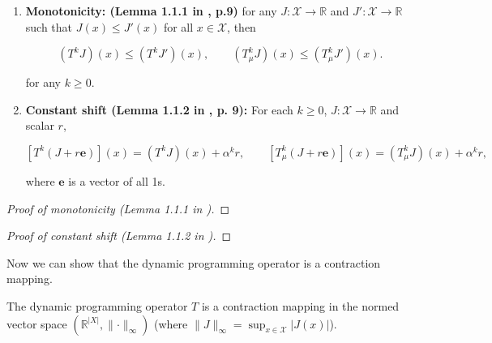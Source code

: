\begin{theorem}\label{dp.thm.dp.op.mono.cs}

\begin{enumerate}

\item

\textbf{Monotonicity: (Lemma 1.1.1 in \citet{v2_bertsekas2012dynamic}, p.9)} for any \(J: \mathcal{X} \to \mathbb{R}\) and \(J': \mathcal{X} \to \mathbb{R}\) such that \(J(x) \leq J'(x)\) for all \(x \in \mathcal{X}\), then

\[
(T^kJ)(x) \leq (T^k J')(x), \qquad (T_\mu^k J)(x) \leq (T_\mu^k J')(x).
\]

for any \(k \geq 0 \).

\item \textbf{Constant shift  (Lemma 1.1.2 in \citet{v2_bertsekas2012dynamic}, p. 9):} For each \(k \geq 0\),  \(J: \mathcal{X} \to \mathbb{R}\) and scalar \(r\),

\[
[T^k (J + r \boldsymbol{e})](x) = (T^kJ)(x) + \alpha^k r, \qquad  [T_\mu^k (J + r \boldsymbol{e})](x) = (T_\mu^kJ)(x) + \alpha^k r, 
\]

where \(\boldsymbol{e}\) is a vector of all 1s.


\end{enumerate}

\end{theorem}

\begin{proof}[Proof of monotonicity (Lemma 1.1.1 in \citet{v2_bertsekas2012dynamic})]

\end{proof}

\begin{proof}[Proof of constant shift (Lemma 1.1.2 in \citet{v2_bertsekas2012dynamic})]

\end{proof}



Now we can show that the dynamic programming operator is a contraction mapping.

\begin{theorem} \label{dp.op.c.mapping}

 The dynamic programming operator \(T\) is a contraction mapping in the normed vector space \((\mathbb{R}^{|X|}, \lVert \cdot \rVert_\infty)\) (where \( \lVert J \rVert_\infty = \sup_{x \in \mathcal{X}}|J(x)|\)).

\end{theorem}

